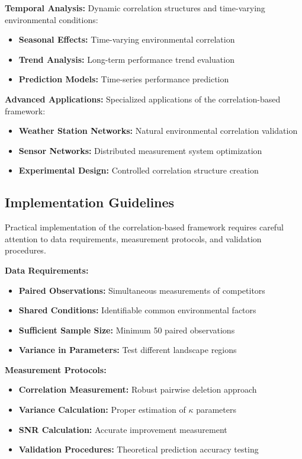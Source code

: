 \textbf{Temporal Analysis:}
Dynamic correlation structures and time-varying environmental conditions:
\begin{itemize}
    \item \textbf{Seasonal Effects:} Time-varying environmental correlation
    \item \textbf{Trend Analysis:} Long-term performance trend evaluation
    \item \textbf{Prediction Models:} Time-series performance prediction
\end{itemize}

\textbf{Advanced Applications:}
Specialized applications of the correlation-based framework:
\begin{itemize}
    \item \textbf{Weather Station Networks:} Natural environmental correlation validation
    \item \textbf{Sensor Networks:} Distributed measurement system optimization
    \item \textbf{Experimental Design:} Controlled correlation structure creation
\end{itemize}

\subsection{Implementation Guidelines}

Practical implementation of the correlation-based framework requires careful attention to data requirements, measurement protocols, and validation procedures.

\textbf{Data Requirements:}
\begin{itemize}
    \item \textbf{Paired Observations:} Simultaneous measurements of competitors
    \item \textbf{Shared Conditions:} Identifiable common environmental factors
    \item \textbf{Sufficient Sample Size:} Minimum 50 paired observations
    \item \textbf{Variance in Parameters:} Test different landscape regions
\end{itemize}

\textbf{Measurement Protocols:}
\begin{itemize}
    \item \textbf{Correlation Measurement:} Robust pairwise deletion approach
    \item \textbf{Variance Calculation:} Proper estimation of $\kappa$ parameters
    \item \textbf{SNR Calculation:} Accurate improvement measurement
    \item \textbf{Validation Procedures:} Theoretical prediction accuracy testing
\end{itemize}

